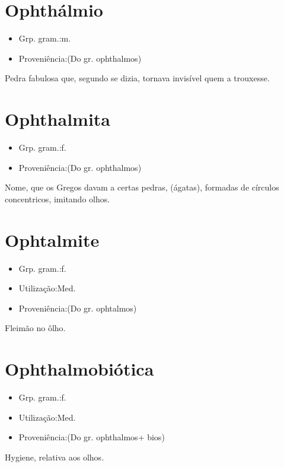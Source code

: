 \section{Ophthálmio}
\begin{itemize}
\item {Grp. gram.:m.}
\end{itemize}
\begin{itemize}
\item {Proveniência:(Do gr. \textunderscore ophthalmos\textunderscore )}
\end{itemize}
Pedra fabulosa que, segundo se dizia, tornava invisível quem a trouxesse.
\section{Ophthalmita}
\begin{itemize}
\item {Grp. gram.:f.}
\end{itemize}
\begin{itemize}
\item {Proveniência:(Do gr. \textunderscore ophthalmos\textunderscore )}
\end{itemize}
Nome, que os Gregos davam a certas pedras, (ágatas), formadas de círculos concentricos, imitando olhos.
\section{Ophtalmite}
\begin{itemize}
\item {Grp. gram.:f.}
\end{itemize}
\begin{itemize}
\item {Utilização:Med.}
\end{itemize}
\begin{itemize}
\item {Proveniência:(Do gr. \textunderscore ophtalmos\textunderscore )}
\end{itemize}
Fleimão no ôlho.
\section{Ophthalmobiótica}
\begin{itemize}
\item {Grp. gram.:f.}
\end{itemize}
\begin{itemize}
\item {Utilização:Med.}
\end{itemize}
\begin{itemize}
\item {Proveniência:(Do gr. \textunderscore ophthalmos\textunderscore  + \textunderscore bios\textunderscore )}
\end{itemize}
Hygiene, relativa aos olhos.
